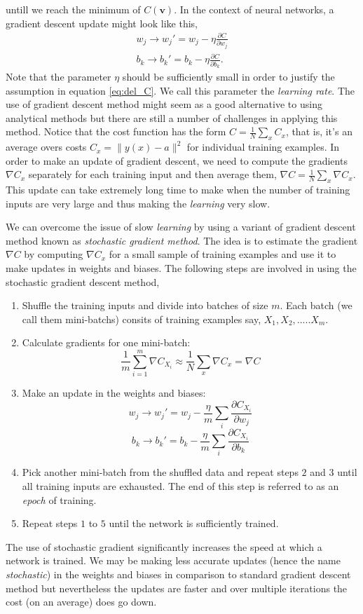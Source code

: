 untill we reach the minimum of $C(\mathbf{v})$. In the context of neural networks, a gradient descent update might look like this, 
\begin{equation}
    \begin{aligned}
        w_j \rightarrow w_j' = w_j - \eta \frac{\partial C}{\partial w_j}\\
        b_k \rightarrow b_k' = b_k - \eta \frac{\partial C}{\partial b_k}.
    \end{aligned}
\end{equation}
Note that the parameter $\eta$ should be sufficiently small in order to justify the assumption in equation \eqref{eq:del_C}. 
We call this parameter the \emph{learning rate}. The use of gradient descent method might seem as a
good alternative to using analytical methods but there are still a number of challenges in applying this method. Notice that the cost function has the form
$C = \frac{1}{N} \sum_x C_x$, that is, it's an average overs costs $C_x = \|y(x) - a\|^2$ for individual training examples. In order to make an update of gradient
descent, we need to compute the gradients $\nabla C_x$ separately for each training input and then average them, $\nabla C = \frac{1}{N} \sum_x \nabla C_x$. This update can take 
extremely long time to make when the number of training inputs are very large and thus making the \emph{learning} very slow. 

We can overcome the issue of slow \emph{learning} by using a variant of gradient descent method known as \emph{stochastic gradient method}. The idea is to estimate the gradient
$\nabla C$ by computing $\nabla C_x$ for a small sample of training examples and use it to make updates in weights and biases. The following steps are involved in using the stochastic gradient descent method,
\begin{enumerate}
    \item Shuffle the training inputs and divide into batches of size $m$. Each batch (we call them mini-batchs) consits of training examples say, $X_1, X_2, .....X_m$.
    \item Calculate gradients for one mini-batch: $$\frac{1}{m} \sum_{i=1}^{m} \nabla C_{X_i} \approx \frac{1}{N} \sum_x \nabla C_x = \nabla C$$
    \item Make an update in the weights and biases: 
    $$w_j \rightarrow w_j' = w_j - \frac{\eta}{m} \sum_i \frac{\partial C_{X_i}}{\partial w_j}$$
    $$b_k \rightarrow b_k' = b_k - \frac{\eta}{m} \sum_i \frac{\partial C_{X_i}}{\partial b_k}$$
    \item Pick another mini-batch from the shuffled data and repeat steps $2$ and $3$ until all training inputs are exhausted. The end of this step is referred to as an \emph{epoch} of training.
    \item Repeat steps $1$ to $5$ until the network is sufficiently trained.
\end{enumerate}
The use of stochastic gradient significantly increases the speed at which a network is trained. We may be making less accurate updates (hence the name \emph{stochastic}) in the weights and biases in comparison to 
standard gradient descent method but nevertheless the updates are faster and over multiple iterations the cost (on an average) does go down.   
